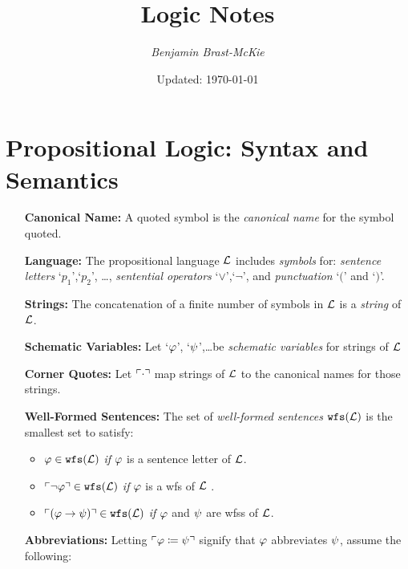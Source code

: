 \documentclass[a4paper, 11pt]{article} %
\title{\textbf{Logic Notes}} %
\author{\em Benjamin Brast-McKie} %
\date{Updated: \today} %
\makeatletter
\renewcommand{\maketitle}{ %
\begin{flushright} %
{\@date\hfill \LARGE\@title} %

\vspace{5pt} %

{\@author} %

\end{flushright}
}
\makeatother
\begin{document}
\maketitle %
\thispagestyle{empty}



\section*{\sc Propositional Logic: Syntax and Semantics}

\begin{enumerate}[leftmargin=1.2in,labelsep=.15in] %
  \item[\bf Canonical Name:] A quoted symbol is the \textit{canonical name} for the symbol quoted.
  \item[\bf Language:] The propositional language $\mathcal{L}$ includes \textit{symbols} for: \textit{sentence letters} `$p_1$',`$p_2$', \dots, \textit{sentential operators} `$\vee$',`$\neg$', and \textit{punctuation} `$($' and `$)$'.
  \item[\bf Strings:] The concatenation of a finite number of symbols in $\mathcal{L}$ is a \textit{string} of $\mathcal{L}$.
  \item[\bf Schematic Variables:] Let `$\varphi$', `$\psi$',\ldots be \textit{schematic variables} for strings of $\mathcal{L}$
  \item[\bf Corner Quotes:] Let $\ulcorner\cdot\urcorner$ map strings of $\mathcal{L}$ to the canonical names for those strings.
  \item[\bf Well-Formed Sentences:] The set of \textit{well-formed sentences} $\texttt{wfs}(\mathcal{L})$ is the smallest set to satisfy:
    \begin{itemize}\small
      \item $\varphi \in \texttt{wfs}(\mathcal{L})$ \textit{if} $\varphi$ is a sentence letter of $\mathcal{L}$. 
      \item $\ulcorner\neg \varphi\urcorner \in \texttt{wfs}(\mathcal{L})$ \textit{if} $\varphi$ is a wfs of $\mathcal{L}$ .
      \item $\ulcorner(\varphi \rightarrow \psi)\urcorner \in \texttt{wfs}(\mathcal{L})$ \textit{if} $\varphi$ and $\psi$ are wfss of $\mathcal{L}$.
    \end{itemize}
  \item[\bf Abbreviations:] Letting $\ulcorner\varphi \coloneq \psi\urcorner$ signify that $\varphi$ abbreviates $\psi$, assume the following:
    \begin{itemize}\small

\end{itemize}
\end{enumerate}
\end{document}
